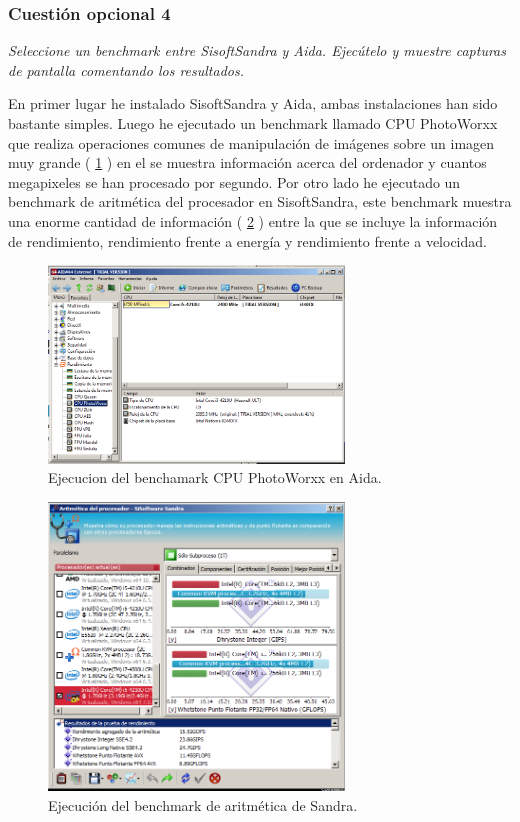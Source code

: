 \subsubsection{Cuestión opcional 4}
\textit{Seleccione un benchmark entre SisoftSandra y Aida.
Ejecútelo y muestre capturas de pantalla comentando los resultados.}
\newline

En primer lugar he instalado SisoftSandra y Aida, ambas instalaciones han sido bastante simples. Luego he ejecutado un benchmark llamado CPU PhotoWorxx que realiza operaciones comunes de manipulación de imágenes sobre un imagen muy grande \cite{aida} ( \cref{aida} ) en el se muestra información acerca del ordenador y cuantos  megapixeles se han procesado por segundo. Por otro lado he ejecutado un benchmark de aritmética del procesador en SisoftSandra, este benchmark muestra una enorme cantidad de información ( \cref{sandra} )  entre la que se incluye la información de rendimiento, rendimiento frente a energía y rendimiento frente a velocidad.

\begin{figure}[H]
  \begin{center}
    \includegraphics[width=0.7\textwidth]{imagenes/aida}
    \caption{Ejecucion del benchamark CPU PhotoWorxx en Aida.}
    \label{aida}
  \end{center}
\end{figure}

\begin{figure}[H]
  \begin{center}
    \includegraphics[width=0.7\textwidth]{imagenes/sandra}
    \caption{Ejecución del benchmark de aritmética de Sandra.}
    \label{sandra}
  \end{center}
\end{figure}

